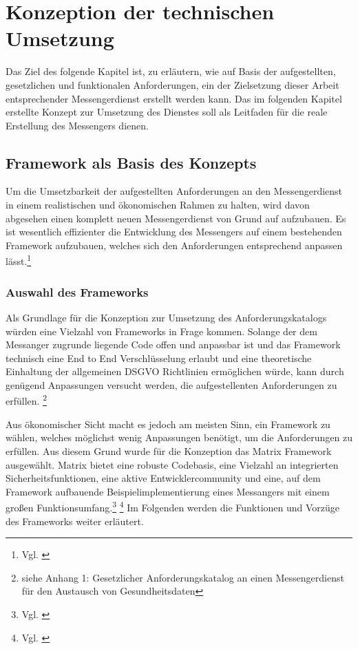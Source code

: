 \chapter{Konzeption der technischen Umsetzung}\label{chapter:tanforderungen}
Das Ziel des folgende Kapitel ist, zu erläutern, wie auf Basis der aufgestellten, gesetzlichen und funktionalen Anforderungen, ein der Zielsetzung dieser Arbeit entsprechender Messengerdienst erstellt werden kann. Das im folgenden Kapitel erstellte Konzept zur Umsetzung des Dienstes soll als Leitfaden für die reale Erstellung des Messengers dienen. 

\section{Framework als Basis des Konzepts}\label{chapter:kr}
Um die Umsetzbarkeit der aufgestellten Anforderungen an den Messengerdienst in einem realistischen und ökonomischen Rahmen zu halten, wird davon abgesehen einen komplett neuen Messengerdienst von Grund auf aufzubauen. Es ist wesentlich effizienter die Entwicklung des Messengers auf einem bestehenden Framework aufzubauen, welches sich den Anforderungen entsprechend anpassen lässt.\footnote{Vgl. \cite[S. 107 ff.]{Johnson2005}}

\subsection{Auswahl des Frameworks}\label{chapter:am}
Als Grundlage für die Konzeption zur Umsetzung des Anforderungskatalogs würden eine Vielzahl von Frameworks in Frage kommen. Solange der dem Messanger zugrunde liegende Code offen und anpassbar ist und das Framework technisch eine End to End Verschlüsselung erlaubt und eine theoretische Einhaltung der allgemeinen DSGVO Richtlinien ermöglichen würde, kann durch genügend Anpassungen versucht werden, die aufgestellenten Anforderungen zu erfüllen. \footnote{siehe Anhang 1: Gesetzlicher Anforderungskatalog an einen Messengerdienst für den Austausch von Gesundheitsdaten}

Aus ökonomischer Sicht macht es jedoch am meisten Sinn, ein Framework zu wählen, welches möglichst wenig Anpassungen benötigt, um die Anforderungen zu erfüllen. Aus diesem Grund wurde für die Konzeption das Matrix Framework ausgewählt.
Matrix bietet eine robuste Codebasis, eine Vielzahl an integrierten Sicherheitsfunktionen, eine aktive Entwicklercommunity und eine, auf dem Framework aufbauende Beispielimplementierung eines Messangers mit einem großen Funktionsumfang.\footnote{Vgl. \cite{Matrix.org2020}} \footnote{Vgl. \cite{Github2020}}  Im Folgenden werden die Funktionen und Vorzüge des Frameworks weiter erläutert.

